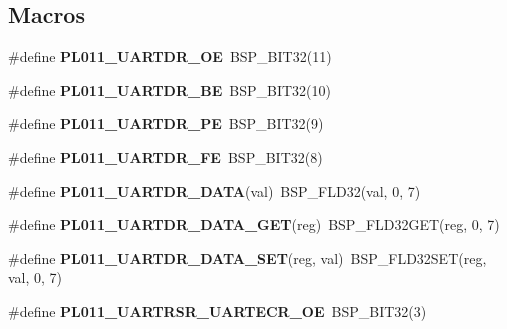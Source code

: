 \subsection*{Macros}
\begin{DoxyCompactItemize}
\item 
\mbox{\label{arm-pl011-regs_8h_a4c249fee3453ed4f54b3ca1b92bf616e}} 
\#define {\bfseries P\+L011\+\_\+\+U\+A\+R\+T\+D\+R\+\_\+\+OE}~B\+S\+P\+\_\+\+B\+I\+T32(11)
\item 
\mbox{\label{arm-pl011-regs_8h_a4e06e37deaf32236466772dab4f8917a}} 
\#define {\bfseries P\+L011\+\_\+\+U\+A\+R\+T\+D\+R\+\_\+\+BE}~B\+S\+P\+\_\+\+B\+I\+T32(10)
\item 
\mbox{\label{arm-pl011-regs_8h_a4feeae2de55cea2111595a75d4bd78ca}} 
\#define {\bfseries P\+L011\+\_\+\+U\+A\+R\+T\+D\+R\+\_\+\+PE}~B\+S\+P\+\_\+\+B\+I\+T32(9)
\item 
\mbox{\label{arm-pl011-regs_8h_ad258af8f6ae75d18be95384ae3556ab9}} 
\#define {\bfseries P\+L011\+\_\+\+U\+A\+R\+T\+D\+R\+\_\+\+FE}~B\+S\+P\+\_\+\+B\+I\+T32(8)
\item 
\mbox{\label{arm-pl011-regs_8h_af3118de8ca4b33ff1b88ba43f00d6121}} 
\#define {\bfseries P\+L011\+\_\+\+U\+A\+R\+T\+D\+R\+\_\+\+D\+A\+TA}(val)~B\+S\+P\+\_\+\+F\+L\+D32(val, 0, 7)
\item 
\mbox{\label{arm-pl011-regs_8h_ae095c1d9c44a648d9aa359ff958e0c2c}} 
\#define {\bfseries P\+L011\+\_\+\+U\+A\+R\+T\+D\+R\+\_\+\+D\+A\+T\+A\+\_\+\+G\+ET}(reg)~B\+S\+P\+\_\+\+F\+L\+D32\+G\+ET(reg, 0, 7)
\item 
\mbox{\label{arm-pl011-regs_8h_a603559c2f11e64e48feaa4cc793e21b4}} 
\#define {\bfseries P\+L011\+\_\+\+U\+A\+R\+T\+D\+R\+\_\+\+D\+A\+T\+A\+\_\+\+S\+ET}(reg,  val)~B\+S\+P\+\_\+\+F\+L\+D32\+S\+ET(reg, val, 0, 7)
\item 
\mbox{\label{arm-pl011-regs_8h_ab6fc3b8567182bcb9cd4b156c88984a7}} 
\#define {\bfseries P\+L011\+\_\+\+U\+A\+R\+T\+R\+S\+R\+\_\+\+U\+A\+R\+T\+E\+C\+R\+\_\+\+OE}~B\+S\+P\+\_\+\+B\+I\+T32(3)
\item 

\end{DoxyCompactItemize}

